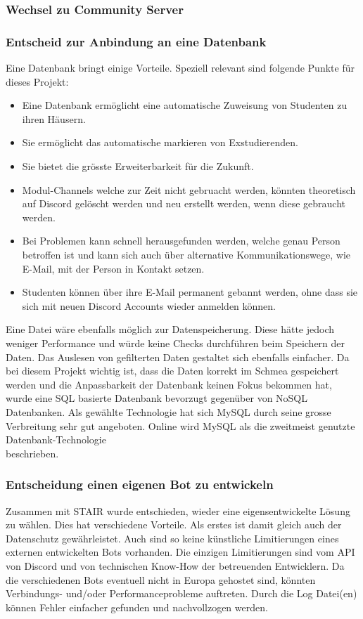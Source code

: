 \documentclass[a4paper, table]{article}
\begin{document}
\subsubsection*{Wechsel zu Community Server}

\subsubsection*{Entscheid zur Anbindung an eine Datenbank}

Eine Datenbank bringt einige Vorteile.
Speziell relevant sind folgende Punkte für dieses Projekt:
\begin{itemize}
    \item Eine Datenbank ermöglicht eine automatische Zuweisung von Studenten zu ihren Häusern.
    \item Sie ermöglicht das automatische markieren von Exstudierenden.
    \item Sie bietet die grösste Erweiterbarkeit für die Zukunft.
    \item Modul-Channels welche zur Zeit nicht gebruacht werden, könnten theoretisch auf Discord gelöscht werden und neu erstellt werden, wenn diese gebraucht werden.
    \item Bei Problemen kann schnell herausgefunden werden, welche genau Person betroffen ist und kann sich auch über alternative Kommunikationswege, wie E-Mail, mit der Person in Kontakt setzen.
    \item Studenten können über ihre E-Mail permanent gebannt werden, ohne dass sie sich mit neuen Discord Accounts wieder anmelden können.
\end{itemize}

Eine Datei wäre ebenfalls möglich zur Datenspeicherung.
Diese hätte jedoch weniger Performance und würde keine Checks durchführen beim Speichern der Daten.
Das Auslesen von gefilterten Daten gestaltet sich ebenfalls einfacher.\autocite{castro_why_2020}
Da bei diesem Projekt wichtig ist, dass die Daten korrekt im Schmea gespeichert werden und die Anpassbarkeit der Datenbank keinen Fokus bekommen hat, wurde eine SQL basierte Datenbank bevorzugt gegenüber von NoSQL Datenbanken.
Als gewählte Technologie hat sich MySQL durch seine grosse Verbreitung sehr gut angeboten.
Online wird MySQL als die zweitmeist genutzte Datenbank-Technologie\\beschrieben.\autocite{noauthor_db-engines_2022}

\subsubsection*{Entscheidung einen eigenen Bot zu entwickeln}
Zusammen mit STAIR wurde entschieden, wieder eine eigensentwickelte Lösung zu wählen.
Dies hat verschiedene Vorteile.
Als erstes ist damit gleich auch der Datenschutz gewährleistet.
Auch sind so keine künstliche Limitierungen eines externen entwickelten Bots vorhanden.
Die einzigen Limitierungen sind vom API von Discord und von technischen Know-How der betreuenden Entwicklern.
Da die verschiedenen Bots eventuell nicht in Europa gehostet sind, könnten Verbindungs- und/oder Performanceprobleme auftreten.
Durch die Log Datei(en) können Fehler einfacher gefunden und nachvollzogen werden.
\newpage
\end{document}
